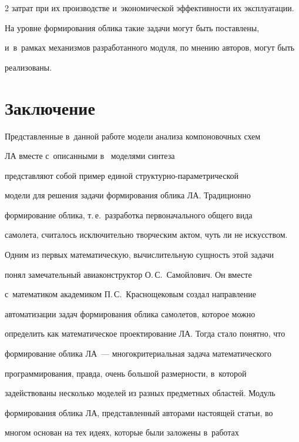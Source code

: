 \begin{multicols}{2}
затрат при их производстве и~экономической эф\-фек\-тив\-ности их эксплуатации. 


На уровне формирования облика такие задачи могут быть по\-став\-ле\-ны, 


и~в~рамках механизмов разработанного модуля, по мнению авторов, могут быть 


реализованы.


  





\section{Заключение}





  Представленные в~данной работе модели анализа компоновочных схем 


ЛА вместе с~описанными в~\cite{5-fl} моделями синтеза 


представляют собой пример единой струк\-тур\-но-па\-ра\-мет\-ри\-че\-ской 


модели для решения задачи формирования облика ЛА. Традиционно 


формирование облика, т.\,е.\ разработка первоначального общего вида 


самолета, считалось исключительно творческим актом, чуть ли не искусством. 


Одним из первых математическую, вы\-чис\-ли\-тель\-ную сущ\-ность этой задачи 


понял замечательный авиаконструктор О.\,С.~Са\-мой\-ло\-вич. Он вместе 


с~математиком академиком П.\,С.~Крас\-но\-ще\-ко\-вым создал направление 


автоматизации задач формирования облика самолетов, которое можно 


определить как математическое проектирование ЛА. Тогда стало понятно, что 


формирование облика ЛА~--- многокритериальная задача математического 


программирования, правда, очень большой раз\-мер\-ности, в~которой 


задействованы несколько моделей из разных пред\-мет\-ных областей. Модуль 


формирования облика ЛА, пред\-став\-лен\-ный авторами на\-сто\-ящей статьи, во 


многом основан на тех идеях, которые были заложены в~работах 



\end{multicols}
